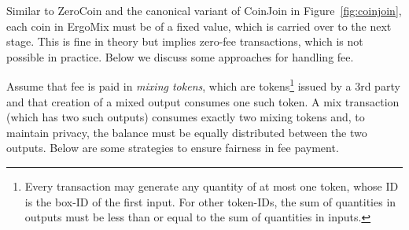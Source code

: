 \documentclass[11pt]{article}
\newcommand{\mixname}{ErgoMix\xspace}
\begin{document}
Similar to ZeroCoin and the canonical variant of CoinJoin in Figure~\ref{fig:coinjoin}, each coin in \mixname must be of a fixed value, which is carried over to the next stage. 
This is fine in theory but implies zero-fee transactions, which is not possible in practice. Below we discuss some approaches for handling fee. 

Assume that fee is paid in {\em mixing tokens}, which are tokens\footnote{Every transaction may generate any quantity of at most one token, whose ID is the box-ID of the first input. For other token-IDs, the sum of quantities in outputs must be less than or equal to the sum of quantities in inputs.} issued by a 3rd party and that creation of a mixed output consumes one such token. A mix transaction (which has two such outputs) consumes exactly two mixing tokens and, to maintain privacy, the balance must be equally distributed between the two outputs. Below are some strategies to ensure fairness in fee payment. 
\end{document}
